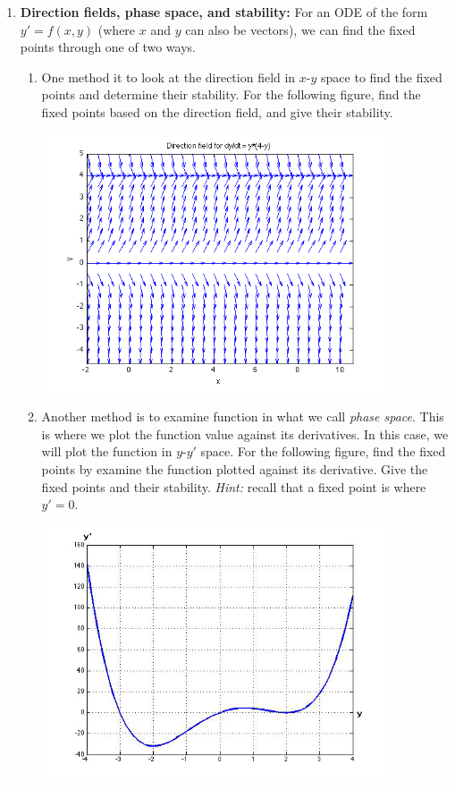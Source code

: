 \documentclass[letterpaper, fontsize=11pt]{scrartcl} %
\numberwithin{equation}{section} %
\numberwithin{figure}{section} %
\numberwithin{table}{section} %
\begin{document}
\begin{enumerate}
\item \textbf{Direction fields, phase space, and stability:} For an ODE of the form $y' = f(x,y)$ (where $x$ and $y$ can also be vectors), we can find the fixed points through one of two ways. 
\begin{enumerate}
\item One method it to look at the direction field in $x$-$y$ space to find the fixed points and determine their stability. For the following figure, find the fixed points based on the direction field, and give their stability. \par
\begin{center}
\includegraphics[width= 4in]{section2_1.png}
\end{center}
\item Another method is to examine function in what we call \textit{phase space}. This is where we plot the function value against its derivatives. In this case, we will plot the function in $y$-$y'$ space. For the following figure, find the fixed points by examine the function plotted against its derivative. Give the fixed points and their stability. \textit{Hint:} recall that a fixed point is where $y' = 0$. \newline
\begin{center}
\includegraphics[width= 4in]{section2_2.jpg}
\end{center} 
\end{enumerate}



\end{enumerate}
\end{document}
